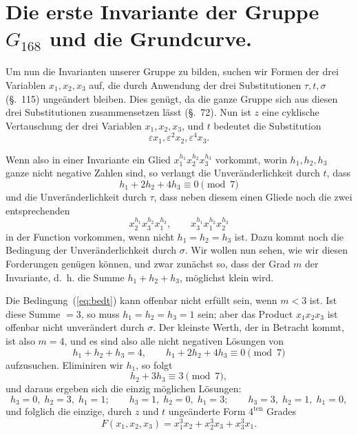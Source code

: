 \documentclass[12pt,a4paper]{article}
\begin{document}
\newpage
\section{Die erste Invariante der Gruppe $G_{168}$ und die Grundcurve.}
\label{sec:122}

Um nun die Invarianten unserer Gruppe zu bilden, suchen wir Formen der drei Variablen $x_1, x_2, x_3$ auf, die durch Anwendung der drei Substitutionen $\tau, t, \sigma$ (\S.~115) unge\"andert bleiben. Dies gen\"ugt, da die ganze Gruppe sich aus diesen drei Substitutionen zusammensetzen l\"asst (\S.~72). Nun ist $z$ eine cyklische Vertauschung der drei Variablen $x_1, x_2, x_3$, und $t$ bedeutet die Substitution
\[\varepsilon x_1, \varepsilon^2 x_2, \varepsilon^4 x_3.\]

Wenn also in einer Invariante ein Glied $x_1^{h_1} x_2^{h_2} x_3^{h_3}$ vorkommt, worin $h_1, h_2, h_3$ ganze nicht negative Zahlen sind, so verlangt die Unver\"anderlichkeit durch $t$, dass
\begin{equation}
\label{eq:bedt} h_1 + 2h_2 + 4h_3 \equiv 0 \pmod{7}
\end{equation}
und die Unver\"anderlichkeit durch $\tau$, dass neben diesem einen Gliede noch die zwei entsprechenden
\[x_2^{h_1} x_3^{h_2} x_1^{h_3}, \qquad x_3^{h_1} x_1^{h_2} x_2^{h_3}\]
in der Function vorkommen, wenn nicht $h_1 = h_2 = h_3$ ist. Dazu kommt noch die Bedingung der Unver\"anderlichkeit durch $\sigma$. Wir wollen nun sehen, wie wir diesen Forderungen gen\"ugen k\"onnen, und zwar zun\"achst so, dass der Grad $m$ der Invariante, d.~h. die Summe $h_1 + h_2 + h_3$, m\"oglichst klein wird.

Die Bedingung~(\ref{eq:bedt}) kann offenbar nicht erf\"ullt sein, wenn $m < 3$ ist. Ist diese Summe $= 3$, so muss $h_1 = h_2 = h_3 = 1$ sein; aber das Product $x_1 x_2 x_3$ ist offenbar nicht unver\"andert durch $\sigma$. Der kleinste Werth, der in Betracht kommt, ist also $m = 4$, und es sind also alle nicht negativen L\"osungen von
\[h_1 + h_2 + h_3 = 4, \qquad h_1 + 2h_2 + 4h_3 \equiv 0 \pmod{7}\]
aufzusuchen. Eliminiren wir $h_1$, so folgt
\[h_2 + 3h_3 \equiv 3 \pmod{7},\]
und daraus ergeben sich die einzig m\"oglichen L\"osungen:
\[h_3 = 0, \; h_2 = 3, \; h_1 = 1; \qquad h_3 = 1, \; h_2 = 0, \; h_1 = 3; \qquad h_3 = 3, \; h_2 = 1, \; h_1 = 0,\]
und folglich die einzige, durch $z$ und $t$ unge\"anderte Form $4^{\text{ten}}$ Grades
\begin{equation}
\label{eq:F} F(x_1, x_2, x_3) = x_1^3 x_2 + x_2^3 x_3 + x_3^3 x_1.
\end{equation}
\end{document}
